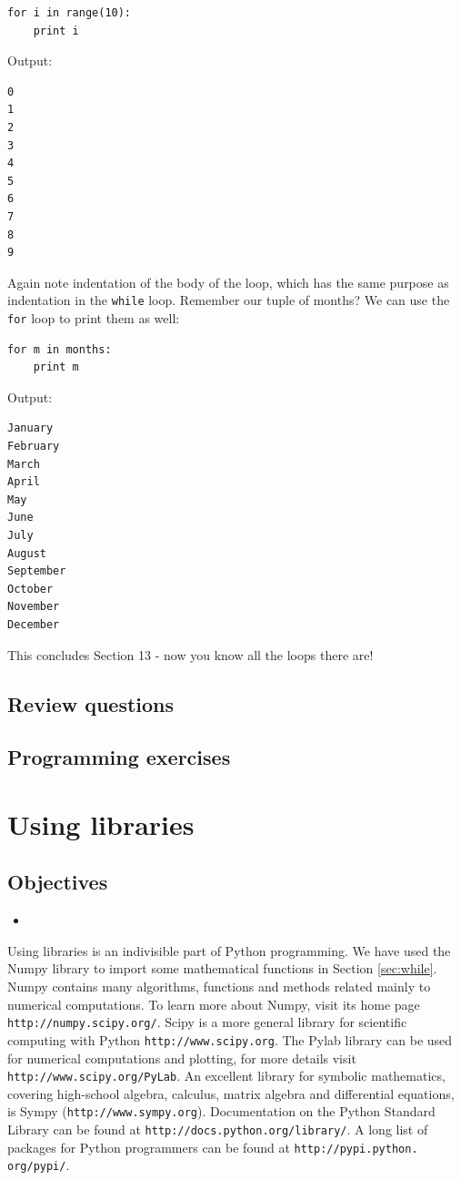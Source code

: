 \begin{verbatim}
for i in range(10):
    print i
\end{verbatim}
Output:

\begin{verbatim}
0
1
2
3
4
5
6
7
8
9
\end{verbatim}
Again note indentation of the body of the loop, which has the same 
purpose as indentation in the {\tt while} loop. Remember our tuple
of months? We can use the {\tt for} loop to print them as well:

\begin{verbatim}
for m in months:
    print m
\end{verbatim}
Output:

\begin{verbatim}
January
February
March
April
May
June
July
August
September
October
November
December
\end{verbatim}
This concludes Section 13 - now you know all the loops there are!

\subsection{Review questions}

\subsection{Programming exercises}





\section{Using libraries}\label{subsec:importinglib}

\subsection{Objectives}

\begin{itemize}
\item
\end{itemize}

Using libraries is an indivisible part of Python programming. We have 
used the Numpy library to import some mathematical functions in Section 
\ref{sec:while}. Numpy contains many algorithms, functions and methods 
related mainly to numerical computations. To learn more about Numpy,
visit its home page {\tt http://numpy.scipy.org/}. Scipy is a more 
general library for scientific computing with Python {\tt http://www.scipy.org}.
The Pylab library can be used for numerical computations and plotting,
for more details visit {\tt http://www.scipy.org/PyLab}. An excellent 
library for symbolic mathematics, covering high-school algebra, calculus,
matrix algebra and differential equations, is Sympy ({\tt http://www.sympy.org}).
Documentation on the Python Standard Library can be found at 
{\tt http://docs.python.org/library/}. A long list of packages for Python 
programmers can be found at {\tt http://pypi.python. org/pypi/}.

